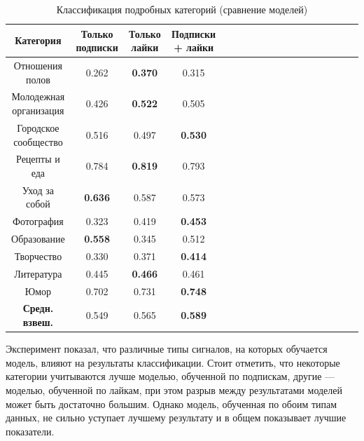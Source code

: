 \documentclass[times,specification,annotation]{itmo-student-thesis}
\begin{document}
\begin{table}[!h]
\caption{Классификация подробных категорий (сравнение моделей)}\label{tab-all-d}
\centering
\begin{tabular}{|*{18}{c|}}\hline
Категория & Только подписки  & Только лайки & Подписки + лайки \\\hline
Отношения полов          & 0.262 & \textbf{0.370} & 0.315  \\\hline
Молодежная организация           & 0.426 & \textbf{0.522} & 0.505  \\\hline
Городское сообщество           & 0.516 & 0.497 & \textbf{0.530} \\\hline
Рецепты и еда          & 0.784 & \textbf{0.819} & 0.793   \\\hline
Уход за собой          & \textbf{0.636} & 0.587 & 0.573  \\\hline
Фотография           & 0.323 & 0.419 & \textbf{0.453} \\\hline
Образование           & \textbf{0.558} & 0.345 & 0.512 \\\hline
Творчество           & 0.330 & 0.371 & \textbf{0.414} \\\hline
Литература          & 0.445 & \textbf{0.466} & 0.461 \\\hline
Юмор          & 0.702 & 0.731 & \textbf{0.748} \\\hline
\textbf{Средн. взвеш.}  & 0.549 & 0.565 & \textbf{0.589}  \\\hline
\end{tabular}
\end{table}

Эксперимент показал, что различные типы сигналов, на которых обучается модель, влияют на результаты классификации.  
Стоит отметить, что некоторые категории учитываются лучше моделью, обученной по подпискам, другие --- моделью, обученной по лайкам, при этом разрыв между результатами моделей может быть достаточно большим. Однако модель, обученная по обоим типам данных, не сильно уступает лучшему результату и в общем показывает лучшие показатели. 
\end{document}
